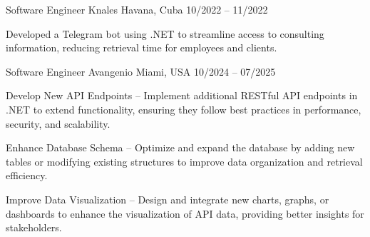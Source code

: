 \documentclass[]{awesome-cv}
\begin{document}
\begin{cventries}
	\cventry
	{Software Engineer}
	{Knales}
	{Havana, Cuba}
	{10/2022 – 11/2022}
	{\begin{cvitems}
			\vspace{0.5mm}
			\item {Developed a Telegram bot using .NET to streamline access to consulting information, reducing retrieval time for employees and clients.}
		\end{cvitems}}

	\cventry
	{Software Engineer}
	{Avangenio}
	{Miami, USA}
	{10/2024 – 07/2025}
	{\begin{cvitems}
			\vspace{0.5mm}
			\item {Develop New API Endpoints – Implement additional RESTful API endpoints in .NET to extend functionality, ensuring they follow best practices in performance, security, and scalability.}
			\item {Enhance Database Schema – Optimize and expand the database by adding new tables or modifying existing structures to improve data organization and retrieval efficiency.}
			\item {Improve Data Visualization – Design and integrate new charts, graphs, or dashboards to enhance the visualization of API data, providing better insights for stakeholders.}
		\end{cvitems}}
\end{cventries}
\end{document}
